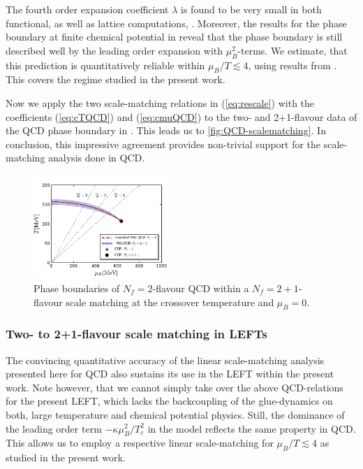 \documentclass[%
reprint,
superscriptaddress,
showpacs,preprintnumbers,
amsmath,amssymb,
aps,
prd,
]{revtex4-1}
\def\eq#1{(\ref{#1})}
\begin{document}
The fourth order expansion coefficient $\lambda$ is found to be very small in both functional, \cite{Fu:2019hdw, Gao:2020fbl, Gao:2020qsj} as well as lattice computations, \cite{Bazavov:2018mes,Borsanyi:2020fev}. Moreover, the results for the phase boundary at finite chemical potential in \cite{Fu:2019hdw, Gao:2020fbl, Gao:2020qsj, Fischer:2018sdj} reveal that the phase boundary is still described well by the leading  order expansion with $\mu_B^2$-terms. We estimate, that this prediction is quantitatively reliable within $\mu_B/T\lesssim 4$, using results from \cite{Fu:2019hdw, Gao:2020fbl, Gao:2020qsj, Fischer:2018sdj, Braun:2019aow}. This covers the regime studied in the present work. 

Now we apply the two scale-matching relations in \eq{eq:rescale} with the coefficients \eq{eq:cTQCD} and \eq{eq:cmuQCD} to the two- and 2+1-flavour data of the QCD phase boundary in \cite{Fu:2019hdw}. This leads us to \autoref{fig:QCD-scalematching}. In conclusion, this impressive agreement provides non-trivial support for the scale-matching analysis done in QCD. 

%
\begin{figure}[t]
\includegraphics[width=0.45\textwidth]{QCD-scalematching}
\caption{Phase boundaries of $N_f=2$-flavour QCD within a $N_f=2+1$-flavour scale matching at the crossover temperature and $\mu_B=0$.}\label{fig:QCD-scalematching}
\end{figure}
%

\subsubsection{Two- to 2+1-flavour scale matching in LEFTs}	


	
The convincing quantitative accuracy of the linear scale-matching analysis presented here for QCD also sustains its use in the LEFT within the present work. Note however, that we cannot simply take over the above QCD-relations for the present LEFT, which lacks the backcoupling of the glue-dynamics on both, large temperature and chemical potential physics. Still, the dominance of the leading order term $-\kappa \mu_B^2/T_c^2$ in the model reflects the same property in QCD. This allows us to employ a respective linear scale-matching for $\mu_B/T\lesssim 4$ as studied in the present work. 
	
\end{document}
